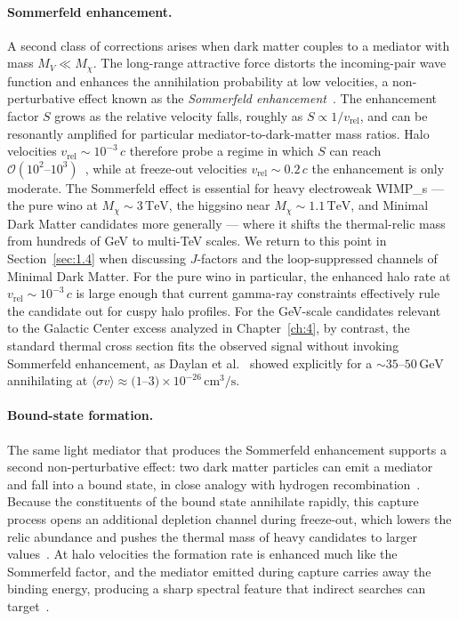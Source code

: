 \paragraph{Sommerfeld enhancement.}
A second class of corrections arises when dark matter couples to a mediator with mass $M_V \ll M_\chi$.
The long-range attractive force distorts the incoming-pair wave function and enhances the annihilation probability at low velocities, a non-perturbative effect known as the \emph{Sommerfeld enhancement}~\cite{Hisano:2004ds,ArkaniHamed:2008qn}.
The enhancement factor $S$ grows as the relative velocity falls, roughly as $S\propto 1/v_\mathrm{rel}$, and can be resonantly amplified for particular mediator-to-dark-matter mass ratios.
Halo velocities $v_\mathrm{rel}\sim 10^{-3}\,c$ therefore probe a regime in which $S$ can reach $\mathcal{O}(10^2\text{--}10^3)$~\cite{Hisano:2004ds}, while at freeze-out velocities $v_\mathrm{rel}\sim 0.2\,c$ the enhancement is only moderate.
The Sommerfeld effect is essential for heavy electroweak \glspl{WIMP_} --- the pure wino at $M_\chi\sim 3\,\mathrm{TeV}$, the higgsino near $M_\chi\sim 1.1\,\mathrm{TeV}$, and Minimal Dark Matter candidates more generally --- where it shifts the thermal-relic mass from hundreds of GeV to multi-TeV scales. We return to this point in Section~\ref{sec:1.4} when discussing $J$-factors and the loop-suppressed channels of Minimal Dark Matter.
For the pure wino in particular, the enhanced halo rate at $v_\mathrm{rel}\sim 10^{-3}\,c$ is large enough that current gamma-ray constraints effectively rule the candidate out for cuspy halo profiles.
For the GeV-scale candidates relevant to the Galactic Center excess analyzed in Chapter~\ref{ch:4}, by contrast, the standard thermal cross section fits the observed signal without invoking Sommerfeld enhancement, as Daylan et al.~\cite{Daylan:2014rsa} showed explicitly for a $\sim 35$--$50\,\mathrm{GeV}$ \WIMP annihilating at $\langle\sigma v\rangle \approx (1$--$3)\times 10^{-26}\,\mathrm{cm}^3/\mathrm{s}$.

\paragraph{Bound-state formation.}
The same light mediator that produces the Sommerfeld enhancement supports a second non-perturbative effect: two dark matter particles can emit a mediator and fall into a bound state, in close analogy with hydrogen recombination~\cite{vonHarling:2014kha}.
Because the constituents of the bound state annihilate rapidly, this capture process opens an additional depletion channel during freeze-out, which lowers the relic abundance and pushes the thermal mass of heavy candidates to larger values~\cite{Mitridate:2017izz}.
At halo velocities the formation rate is enhanced much like the Sommerfeld factor, and the mediator emitted during capture carries away the binding energy, producing a sharp spectral feature that indirect searches can target~\cite{Baldes:2020hwx}.

